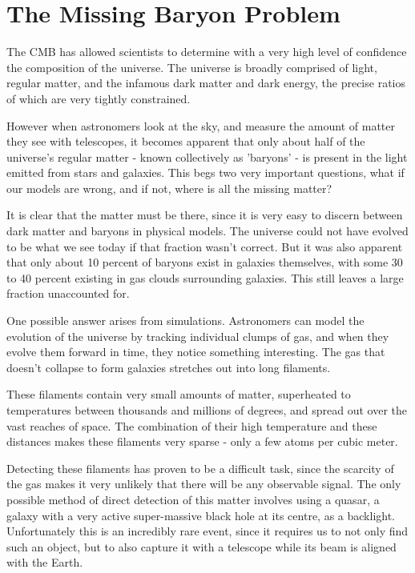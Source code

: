 \documentclass{nature}
\begin{document}
\section{The Missing Baryon Problem}
The CMB has allowed scientists to determine with a very high level of confidence the composition of the universe. The universe is broadly comprised of light, regular matter, and the infamous dark matter and dark energy, the precise ratios of which are very tightly constrained. 

However when astronomers look at the sky, and measure the amount of matter they see with telescopes, it becomes apparent that only about half of the universe's regular matter - known collectively as 'baryons' - is present in the light emitted from stars and galaxies. This begs two very important questions, what if our models are wrong, and if not, where is all the missing matter? 

It is clear that the matter must be there, since it is very easy to discern between dark matter and baryons in physical models. The universe could not have evolved to be what we see today if that fraction wasn't correct. But it was also apparent that only about 10 percent of baryons exist in galaxies themselves, with some 30 to 40 percent existing in gas clouds surrounding galaxies. This still leaves a large fraction unaccounted for. 

One possible answer arises from simulations. Astronomers can model the evolution of the universe by tracking individual clumps of gas, and when they evolve them forward in time, they notice something interesting. The gas that doesn’t collapse to form galaxies stretches out into long filaments.

These filaments contain very small amounts of matter, superheated to temperatures between thousands and millions of degrees, and spread out over the vast reaches of space. The combination of their high temperature and these distances makes these filaments very sparse - only a few atoms per cubic meter. 

Detecting these filaments has proven to be a difficult task, since the scarcity of the gas makes it very unlikely that there will be any observable signal. The only possible method of direct detection of this matter involves using a quasar, a galaxy with a very active super-massive black hole at its centre, as a backlight. Unfortunately this is an incredibly rare event, since it requires us to not only find such an object, but to also capture it with a telescope while its beam is aligned with the Earth. 
\end{document}

